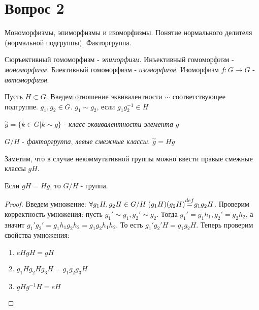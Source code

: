 \section{Вопрос 2}

Мономорфизмы, эпиморфизмы и изоморфизмы. Понятие нормального делителя (нормальной подгруппы). Факторгруппа.

\begin{defn}
  Сюръективный гомоморфизм - \emph{эпиморфизм}. \newline
  Инъективный гомоморфизм - \emph{мономорфизм}. \newline
  Биективный гомоморфизм - \emph{изоморфизм}. \newline
  Изоморфизм $ f: G \rightarrow G $ - \emph{автоморфизм}. \newline
\end{defn}

Пусть $ H \subset G $. Введем отношение эквивалентности $ \sim $ соответствующее подгруппе. $ g_1, g_2 \in G $. $ g_1 \sim g_2 $, если $ g_{1}g_{2}^{-1} \in H $

\begin{defn}
  $  \overset{\sim}{g} = \{ k \in G | k \sim g\} $ - \emph{класс эквивалентности элемента} $g$ 
\end{defn}

\begin{defn}
  $ G/H $ - \emph{факторгруппа}, \emph{левые смежные классы}. $ \overset{\sim}{g} = Hg $
\end{defn}

Заметим, что в случае некоммутативной группы можно ввести правые смежные классы $ gH $.

\begin{thm}
  Если $ gH = Hg $, то $ G/H $ - группа.
\end{thm}

\begin{proof}  
  Введем умножение: $ \forall g_{1}H, g_{2}H \in G/H \; (g_{1}H)(g_{2}H){\buildrel{def}\over{=}}g_{1}g_{2}H $.
  Проверим корректность умножения: пусть $ g_1' \sim g_1, g_2' \sim g_2 $. Тогда
  $ g_1' = g_{1}h_1, g_2' = g_{2}h_2 $, а значит $ g_{1}'g_{2}'= g_{1}h_{1}g_{2}h_{2} = g_{1}g_{2}h_{1}h_{2} $. 
  То есть $ g_{1}'g_{2}'H = g_{1}g_{2}H $. \newline
  Теперь проверим свойства умножения: 
  \begin{enumerate}
    \item $ eHgH = gH $
    \item $ g_{1}Hg_{2}Hg_{3}H = g_{1}g_{2}g_{3}H $
    \item $ gHg^{-1}H = eH $
  \end{enumerate}
\end{proof}

